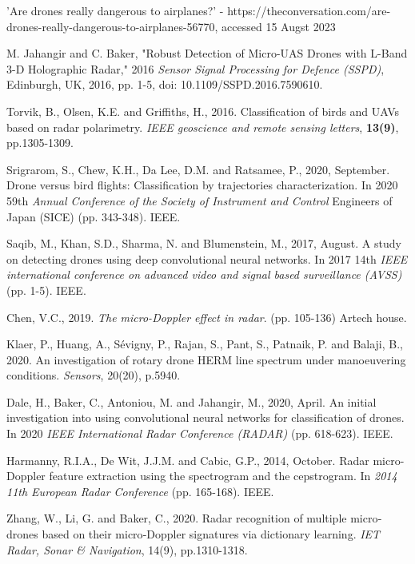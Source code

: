 \documentclass{cta-author}
\begin{document}
\newpage
\begin{thebibliography}{9}
'Are drones really dangerous to airplanes?' - https://theconversation.com/are-drones-really-dangerous-to-airplanes-56770, accessed 15 Augst 2023

M. Jahangir and C. Baker, "Robust Detection of Micro-UAS Drones with L-Band 3-D Holographic Radar," 2016 \textit{Sensor Signal Processing for Defence (SSPD)}, Edinburgh, UK, 2016, pp. 1-5, doi: 10.1109/SSPD.2016.7590610.

Torvik, B., Olsen, K.E. and Griffiths, H., 2016. Classification of birds and UAVs based on radar polarimetry. \textit{IEEE geoscience and remote sensing letters}, \textbf{13(9)}, pp.1305-1309.

Srigrarom, S., Chew, K.H., Da Lee, D.M. and Ratsamee, P., 2020, September. Drone versus bird flights: Classification by trajectories characterization. In 2020 59th \textit{Annual Conference of the Society of Instrument and Control} Engineers of Japan (SICE) (pp. 343-348). IEEE.

Saqib, M., Khan, S.D., Sharma, N. and Blumenstein, M., 2017, August. A study on detecting drones using deep convolutional neural networks. In 2017 14th \textit{IEEE international conference on advanced video and signal based surveillance (AVSS)} (pp. 1-5). IEEE.


Chen, V.C., 2019. \textit{The micro-Doppler effect in radar}. (pp. 105-136) Artech house.

Klaer, P., Huang, A., Sévigny, P., Rajan, S., Pant, S., Patnaik, P. and Balaji, B., 2020. An investigation of rotary drone HERM line spectrum under manoeuvering conditions. \textit{Sensors}, 20(20), p.5940.

Dale, H., Baker, C., Antoniou, M. and Jahangir, M., 2020, April. An initial investigation into using convolutional neural networks for classification of drones. In 2020 \textit{IEEE International Radar Conference (RADAR)} (pp. 618-623). IEEE.

Harmanny, R.I.A., De Wit, J.J.M. and Cabic, G.P., 2014, October. Radar micro-Doppler feature extraction using the spectrogram and the cepstrogram. In \textit{2014 11th European Radar Conference} (pp. 165-168). IEEE.

Zhang, W., Li, G. and Baker, C., 2020. Radar recognition of multiple micro‐drones based on their micro‐Doppler signatures via dictionary learning. \textit{IET Radar, Sonar & Navigation}, 14(9), pp.1310-1318.


\end{thebibliography}
\end{document}
